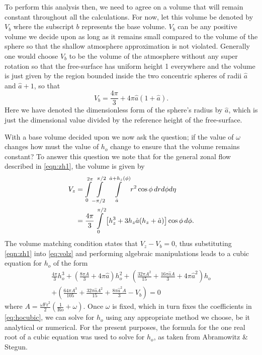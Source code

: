To perform this analysis then, we need to agree on a volume that will remain constant throughout all the calculations. For now, let this volume be denoted by $V_b$ where the subscript $b$ represents the base volume. $V_b$ can be any positive volume we decide upon as long as it remains small compared to the volume of the sphere so that the shallow atmosphere approximation is not violated. Generally one would choose $V_b$ to be the volume of the atmosphere without any super rotation so that the free-surface has uniform height 1 everywhere and the volume is just given by the region bounded inside the two concentric spheres of radii $\hat{a}$ and $\hat{a}+1$, so that
\begin{equation*}
V_b=\frac{4\pi}{3}+4\pi \hat{a}(1+\hat{a}).
\end{equation*}
Here we have denoted the dimensionless form of the sphere's radius by $\hat{a}$, which is just the dimensional value divided by the reference height of the free-surface. 

With a base volume decided upon we now ask the question; if the value of $\omega$ changes how must the value of $h_o$ change to ensure that the volume remains constant? To answer this question we note that for the general zonal flow described in \eqref{eqn:zh1}, the volume is given by
\begin{align}
V_z&=\int\limits_0^{2\pi} \int\limits_{-\pi/2}^{\pi/2} \int\limits_{\hat{a}}^{\hat{a}+h_z(\phi)} r^2 \cos\phi\,dr d\phi d\eta \notag  \\
&=\frac{4\pi}{3} \int\limits_0^{\pi/2} \left[ h_z^3+3h_z \hat{a}(h_z+\hat{a}) \right]\cos\phi \,d\phi. \label{eq:volz}
\end{align}
The volume matching condition states that $V_z-V_b=0$, thus
substituting \eqref{eqn:zh1} into \eqref{eq:volz} and performing algebraic manipulations leads to a cubic equation for $h_o$ of the form
\begin{multline}
\frac{4 \pi}{3}h_o^3+\left( \frac{8\pi A}{3}+4 \pi \hat{a} \right)h_o^2 +\left( \frac{32\pi A^2}{15}+\frac{16\pi \hat{a} A}{3}+4 \pi \hat{a}^2 \right)h_o\\
+\left( \frac{64\pi A^3}{105}+\frac{32\pi \hat{a} A^2}{15}+\frac{8\pi \hat{a}^2 A}{3}-V_b \right)=0 \label{eq:hocubic}
\end{multline}
where $A=\frac{\omega \mathrm{Fr}^2}{2}\left(\frac{1}{\mathrm{Ro}}+\omega \right)$. Once $\omega$ is fixed, which in turn fixes the coefficients in \eqref{eq:hocubic}, we can solve for $h_o$ using any appropriate method we choose, be it analytical or numerical. For the present purposes, the formula for the one real root of a cubic equation was used to solve for $h_o$, as taken from Abramowitz \& Stegun\cite{Abramowitz:HMF}.

